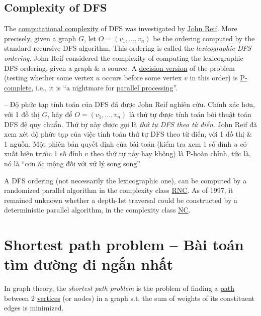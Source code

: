 \documentclass[oneside]{book}
\begin{document}
\subsection{Complexity of DFS}
The \href{https://en.wikipedia.org/wiki/Analysis_of_algorithms}{computational complexity} of DFS was investigated by \href{https://en.wikipedia.org/wiki/John_Reif}{\sc John Reif}. More precisely, given a graph $G$, let $O = (v_1,\ldots,v_n)$ be the ordering computed by the standard recursive DFS algorithm. This ordering is called the {\it lexicographic DFS ordering}. {\sc John Reif} considered the complexity of computing the lexicographic DFS ordering, given a graph \& a source. A \href{https://en.wikipedia.org/wiki/Decision_problem}{decision version} of the problem (testing whether some vertex $u$ occurs before some vertex $v$ in this order) is \href{https://en.wikipedia.org/wiki/P-complete}{P-complete}, i.e., it is ``a nightmare for \href{https://en.wikipedia.org/wiki/Parallel_algorithm}{parallel processing}''.

-- Độ phức tạp tính toán của DFS đã được {\sc John Reif} nghiên cứu. Chính xác hơn, với 1 đồ thị $G$, hãy để $O = (v_1,\ldots,v_n)$ là thứ tự được tính toán bởi thuật toán DFS đệ quy chuẩn. Thứ tự này được gọi là {\it thứ tự DFS theo từ điển}. {\sc John Reif} đã xem xét độ phức tạp của việc tính toán thứ tự DFS theo từ điển, với 1 đồ thị \& 1 nguồn. Một phiên bản quyết định của bài toán (kiểm tra xem 1 số đỉnh $u$ có xuất hiện trước 1 số đỉnh $v$ theo thứ tự này hay không) là P-hoàn chỉnh, tức là, nó là ``cơn ác mộng đối với xử lý song song''.

A DFS ordering (not necessarily the lexicographic one), can be computed by a randomized parallel algorithm in the complexity class \href{https://en.wikipedia.org/wiki/NC_(complexity)}{RNC}. As of 1997, it remained unknown whether a depth-1st traversal could be constructed by a deterministic parallel algorithm, in the complexity class \href{https://en.wikipedia.org/wiki/NC_(complexity)}{NC}.


\section{Shortest path problem -- Bài toán tìm đường đi ngắn nhất}
In graph theory, the {\it shortest path problem} is the problem of finding a \href{https://en.wikipedia.org/wiki/Path_(graph_theory)}{path} between 2 \href{https://en.wikipedia.org/wiki/Vertex_(graph_theory)}{vertices} (or nodes) in a graph s.t. the sum of weights of its constituent edges is minimized.
\end{document}
